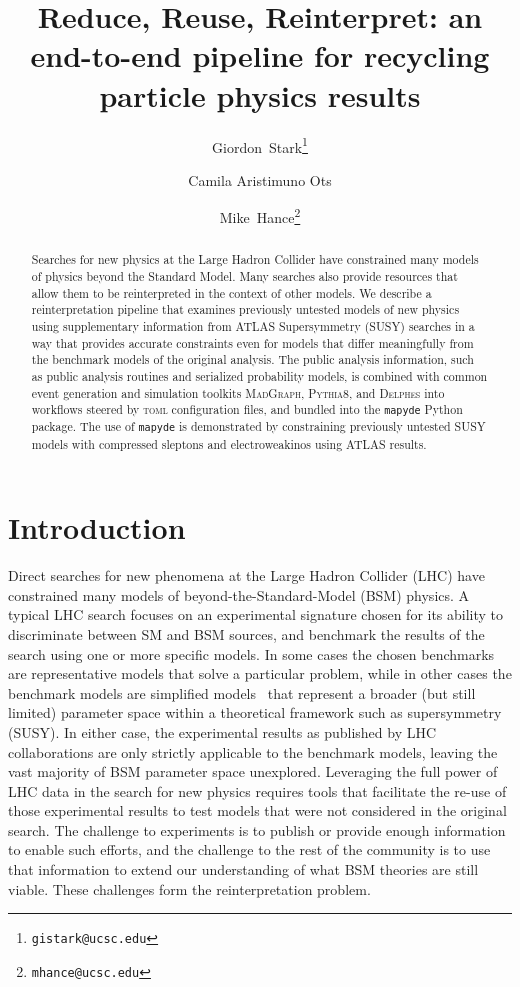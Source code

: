 \documentclass{article}
\title{Reduce, Reuse, Reinterpret: an end-to-end pipeline for recycling particle physics results}
\author[ \,,1]{\orcidaffil{0000-0001-6616-3433}Giordon~Stark\thanks{\texttt{gistark@ucsc.edu}}}
\author[1,2]{Camila Aristimuno Ots}
\author[ \,,1]{\orcidaffil{0000-0001-8392-0934}Mike~Hance\thanks{\texttt{mhance@ucsc.edu}}}
\affil[1]{University of California, Santa Cruz\\ Santa Cruz Institute for Particle Physics\\1156 High Street\\Santa Cruz, CA 95064}
\affil[2]{University of Southern California\\ Liquid Propulsion Laboratory\\ 854 Downey Way, Los Angeles, CA 90089}
\newcommand{\mapyde}{\texttt{mapyde}}
\newcommand{\madgraph}{\textsc{MadGraph}}
\newcommand{\pythia}{\textsc{Pythia8}}
\newcommand{\delphes}{\textsc{Delphes}}
\newcommand{\toml}{\textsc{toml}}
\begin{document}
\maketitle

\begin{abstract}
	Searches for new physics at the Large Hadron Collider have constrained many models of physics beyond the Standard Model.  Many searches also provide resources that allow them to be reinterpreted in the context of other models.  We describe a reinterpretation pipeline that examines previously untested models of new physics using supplementary information from ATLAS Supersymmetry (SUSY) searches in a way that provides accurate constraints even for models that differ meaningfully from the benchmark models of the original analysis.  The public analysis information, such as public analysis routines and serialized probability models, is combined with common event generation and simulation toolkits \madgraph, \pythia, and \delphes{} into workflows steered by \toml{} configuration files, and bundled into the \mapyde{} Python package.  The use of \mapyde{} is demonstrated by constraining previously untested SUSY models with compressed sleptons and electroweakinos using ATLAS results.
\end{abstract}


\section{Introduction}
\label{sec:introduction}

Direct searches for new phenomena at the Large Hadron Collider (LHC) have constrained many models of beyond-the-Standard-Model (BSM) physics.  A typical LHC search focuses on an experimental signature chosen for its ability to discriminate between SM and BSM sources, and benchmark the results of the search using one or more specific models.  In some cases the chosen benchmarks are representative models that solve a particular problem, while in other cases the benchmark models are simplified models~\cite{LHCNewPhysicsWorkingGroup:2011mji} that represent a broader (but still limited) parameter space within a theoretical framework such as supersymmetry (SUSY).  In either case, the experimental results as published by LHC collaborations are only strictly applicable to the benchmark models, leaving the vast majority of BSM parameter space unexplored.  Leveraging the full power of LHC data in the search for new physics requires tools that facilitate the re-use of those experimental results to test models that were not considered in the original search.  The challenge to experiments is to publish or provide enough information to enable such efforts, and the challenge to the rest of the community is to use that information to extend our understanding of what BSM theories are still viable.  These challenges form the reinterpretation problem.
\end{document}

